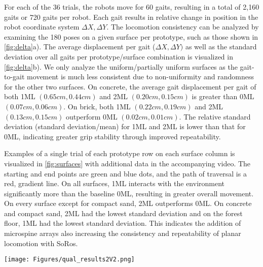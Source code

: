 For each of the 36 trials, the robots move for 60 gaits, resulting in a total of 2,160 gaits or 720 gaits per robot. Each gait results in relative change in position in the robot coordinate system $\Delta X, \Delta Y$. The locomotion consistency can be analyzed by examining the 180 poses on a given surface per prototype, such as those shown in \Fig \ref{fig:delta}a). The average displacement per gait ($\Delta X,\Delta Y)$  as well as the standard deviation over all gaits per prototype/surface combination is visualized in \Fig \ref{fig:delta}b). We only analyze the uniform/partially uniform surfaces as the gait-to-gait movement is much less consistent due to non-uniformity and randomness for the other two surfaces. On concrete, the average gait displacement per gait of both 1ML $(0.65cm,0.44cm)$ and 2ML $(0.20cm,0.15cm)$ is greater than 0ML $(0.07cm,0.06cm)$. On brick, both 1ML $(0.22cm,0.19cm)$ and 2ML $(0.13cm,0.15cm)$ outperform 0ML $(0.02cm,0.01cm)$. The relative standard deviation (standard deviation/mean) for 1ML and 2ML is lower than that for  0ML, indicating greater grip stability through improved repeatability.

Examples of a single trial of each prototype row on each surface column is visualized in \Fig \ref{fig:surfaces} with additional data in the accompanying video. The starting and end points are green and blue dots, and the path of traversal is a red, gradient line. On all surfaces, 1ML interacts with the environment significantly more than the baseline 0ML, resulting in greater overall movement. On every surface except for compact sand, 2ML outperforms 0ML. On concrete and compact sand, 2ML had the lowest standard deviation and on the forest floor, 1ML had the lowest standard deviation. This indicates the addition of microspine arrays also increasing the consistency and repeatability of planar locomotion with SoRos. 




\begin{figure*}[htbp]
    \centering
    \texttt{[image: Figures/qual\_results2V2.png]}
    \caption{Experimental results for 0ML, 1ML, and 2ML on concrete, brick, compact sand, and a forest floor. Rows represent the different surfaces increasing in unstructured nature with the three different prototypes distinguished by columns.}
    \label{fig:surfaces}
\end{figure*}



